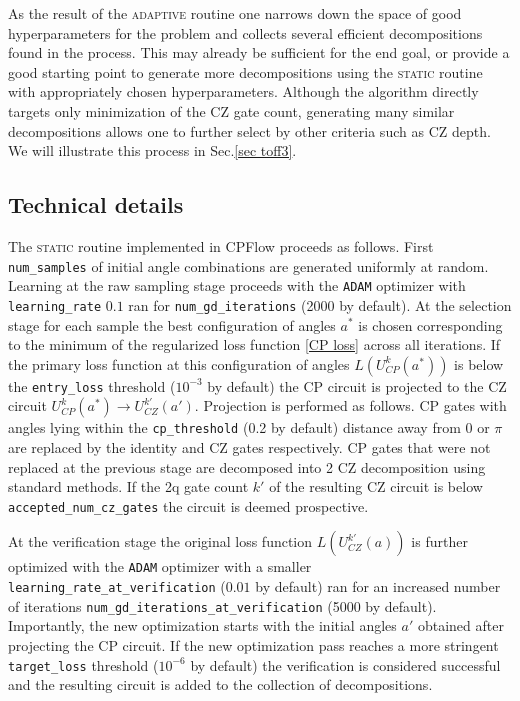 \documentclass[twocolumn, amsfonts, amssymb, aps, nofootinbib]{revtex4-2}
\newcommand{\CZ}{\textsf{CZ }}
\newcommand{\CP}{\textsf{CP }}
\newcommand{\package}[1]{\textrm {#1 }}
\newcommand{\cpflow}{\package{CPFlow}}
\newcommand{\static}{\textsc{static }}
\newcommand{\adaptive}{\textsc{adaptive }}
\newcommand{\param}[1]{\texttt{#1}}
\begin{document}
As the result of the \adaptive routine one narrows down the space of good hyperparameters for the problem and collects several efficient decompositions found in the process. This may already be sufficient for the end goal, or provide a good starting point to generate more decompositions using the \static routine with appropriately chosen hyperparameters. Although the algorithm directly targets only minimization of the \CZ gate count, generating many similar decompositions allows one to further select by other criteria such as \CZ depth. We will illustrate this process in Sec.\ref{sec toff3}.

\subsection{Technical details \label{sec details}}

The \static routine implemented in \cpflow proceeds as follows.
First \param{num\_samples} of initial angle combinations are generated uniformly at random. Learning at the raw sampling stage proceeds with the \param{ADAM} optimizer with \param{learning\_rate} $0.1$ ran for \param{num\_gd\_iterations} (2000 by default).
At the selection stage for each sample the best configuration of angles $a^*$ is chosen corresponding to the minimum of the regularized loss function \eqref{CP loss} across all iterations. If the primary loss function at this configuration of angles $L(U_{CP}^k(a^*))$ is below the \param{entry\_loss} threshold ($10^{-3}$ by default) the \CP circuit is projected to the \CZ circuit $U_{CP}^k(a^*)\to U_{CZ}^{k'}(a')$. Projection is performed as follows. \CP gates with angles lying within the \param{cp\_threshold}  (0.2 by default) distance away from $0$ or $\pi$ are replaced by the identity and \CZ gates respectively.  \CP gates that were not replaced at the previous stage are decomposed into 2 \CZ decomposition using standard methods. If the 2q gate count $k'$ of the resulting \CZ circuit is below \param{accepted\_num\_cz\_gates} the circuit is deemed prospective.

At the verification stage the original loss function $L(U_{CZ}^{k'}(a))$ is further optimized with the \param{ADAM} optimizer with a smaller \param{learning\_rate\_at\_verification} ($0.01$ by default) ran for an increased number of iterations \param{num\_gd\_iterations\_at\_verification} (5000 by default). Importantly, the new optimization starts with the initial angles $a'$ obtained after projecting the \CP circuit. If the new optimization pass reaches a more stringent \param{target\_loss} threshold ($10^{-6}$ by default) the verification is considered successful and the resulting circuit is added to the collection of decompositions.
\end{document}
